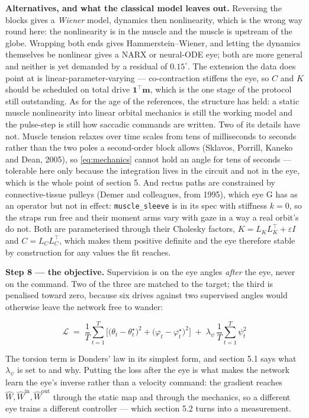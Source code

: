 \documentclass[10pt]{article}
\begin{document}
\textbf{Alternatives, and what the classical model leaves out.} Reversing the blocks gives a
\emph{Wiener} model, dynamics then nonlinearity, which is the wrong way round here: the
nonlinearity is in the muscle and the muscle is upstream of the globe. Wrapping both ends
gives Hammerstein--Wiener, and letting the dynamics themselves be nonlinear gives a NARX or
neural-ODE eye; both are more general and neither is yet demanded by a residual of
$0.15^{\circ}$. The extension the data does point at is linear-parameter-varying ---
co-contraction stiffens the eye, so $C$ and $K$ should be scheduled on total drive
$\mathbf{1}^{\!\top}\mathbf{m}$, which is the one stage of the protocol still outstanding.
As for the age of the references, the structure has held: a static muscle nonlinearity into
linear orbital mechanics is still the working model and the pulse-step is still how saccadic
commands are written. Two of its details have not. Muscle tension relaxes over time scales
from tens of milliseconds to seconds rather than the two poles a second-order block allows
(Sklavos, Porrill, Kaneko and Dean, 2005), so \eqref{eq:mechanics} cannot hold an angle for
tens of seconds --- tolerable here only because the integration lives in the circuit and not
in the eye, which is the whole point of section 5. And rectus paths are constrained by
connective-tissue pulleys (Demer and colleagues, from 1995), which eye G has as an operator
but not in effect: \texttt{muscle\_sleeve} is in its spec with stiffness $k=0$, so the
straps run free and their moment arms vary with gaze in a way a real orbit's do not. Both
are parameterised through their Cholesky factors, $K = L_K L_K^{\!\top} + \varepsilon I$ and
$C = L_C L_C^{\!\top}$, which makes them positive definite and the eye therefore stable by
construction for any values the fit reaches.

\textbf{Step 8 --- the objective.} Supervision is on the eye angles \emph{after} the eye,
never on the command. Two of the three are matched to the target; the third is penalised
toward zero, because six drives against two supervised angles would otherwise leave the
network free to wander:

\begin{equation}
\label{eq:loss}
\mathcal{L}\;=\;\frac{1}{T}\sum_{t=1}^{T}
\Big[\big(\theta_t-\theta^{\star}_t\big)^{2}+\big(\varphi_t-\varphi^{\star}_t\big)^{2}\Big]
\;+\;\lambda_\psi\,\frac{1}{T}\sum_{t=1}^{T}\psi_t^{2}
\end{equation}

The torsion term is Donders' law in its simplest form, and section 5.1 says what
$\lambda_\psi$ is set to and why. Putting the loss after the eye is what makes the network
learn the eye's inverse rather than a velocity command: the gradient reaches $\hat W,\hat
W^{\mathrm{in}},\hat W^{\mathrm{out}}$ through the static map and through the mechanics, so
a different eye trains a different controller --- which section 5.2 turns into a
measurement.
\end{document}
